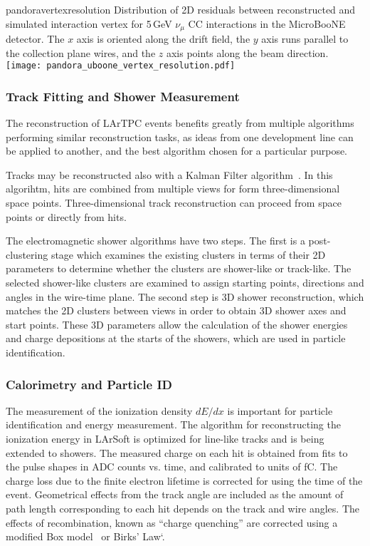 \begin{cdrfigure}{pandoravertexresolution}
{Distribution of 2D residuals between reconstructed and simulated interaction
 vertex for 5\,GeV $\nu_{\mu}$ CC interactions in the MicroBooNE detector.
 The $x$ axis is oriented along the drift field, the $y$ axis runs parallel 
 to the collection plane wires, and the $z$ axis points along the beam direction.}
\texttt{[image: pandora\_uboone\_vertex\_resolution.pdf]}
\end{cdrfigure}


\subsubsection{Track Fitting and Shower Measurement}

The reconstruction of LArTPC events benefits greatly from multiple algorithms
performing similar reconstruction tasks, as ideas from one development line
can be applied to another, and the best algorithm chosen for a particular 
purpose.

Tracks may be reconstructed also with a Kalman Filter algorithm~\cite{kalman}.
In this algorihtm, hits are combined from multiple views for form three-dimensional
space points.  Three-dimensional track reconstruction can proceed from space points
or directly from hits.

The electromagnetic shower algorithms have two
steps. The first is a post-clustering stage which examines the
existing clusters in terms of their 2D parameters to determine whether
the clusters are shower-like or track-like. 
The selected shower-like clusters are examined to assign starting points,
directions and angles in the wire-time plane. The second step is 
3D shower reconstruction, which
matches the 2D clusters between views in order to obtain 3D shower axes and start points.
These 3D parameters allow the calculation of the shower energies and charge
depositions at the starts of the showers, which are used in particle
identification. 


\subsubsection{Calorimetry and Particle ID}

The measurement of the ionization density $dE/dx$ is important
for particle identification and energy measurement.
The algorithm for reconstructing the ionization
energy in LArSoft is optimized for line-like tracks and is being
extended to showers.  The measured charge on each hit is obtained from
fits to the pulse shapes in ADC counts vs. time, and calibrated to units
of fC.  The charge loss due to the finite electron lifetime is corrected for
using the time of the event.  Geometrical effects from the track angle are
included as the amount of path length corresponding to each hit depends on the
track and wire angles.  The effects of recombination, known as ``charge quenching''
are corrected using a modified Box model~\cite{box} or Birks' Law`\cite{birks}.

